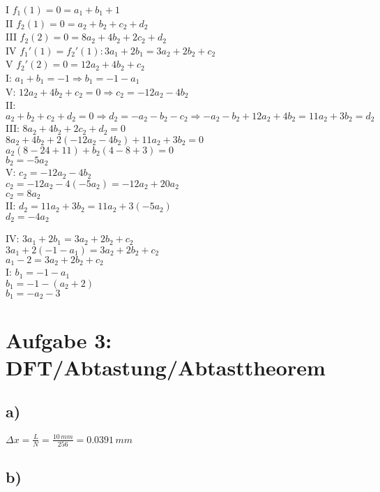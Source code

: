 \documentclass[a4paper,11pt,oneside]{scrartcl}
\begin{document}
I $f_1(1) = 0 = a_1 + b_1 + 1$\\
II $f_2(1) = 0 = a_2 + b_2 + c_2 + d_2$\\
III $f_2(2) = 0 = 8a_2 + 4b_2 + 2c_2 + d_2$\\
IV $f_1'(1) = f_2'(1): 3a_1 + 2b_1 = 3a_2 + 2b_2 + c_2$\\
V $f_2'(2) = 0 = 12a_2 + 4b_2 + c_2$\\

I: $a_1 + b_1 = -1 \Rightarrow b_1 = -1 -a_1$\\
V: $12a_2 + 4b_2 + c_2 = 0 \Rightarrow c_2 = -12a_2 - 4b_2$\\
II: $a_2 + b_2 + c_2 + d_2 = 0 \Rightarrow d_2 = -a_2 - b_2 - c_2 \Rightarrow -a_2 - b_2 + 12a_2 +4b_2 = 11a_2 + 3b_2 = d_2$\\
III: $8a_2 + 4b_2 + 2c_2 + d_2 = 0$\\
$8a_2 + 4b_2 + 2(-12a_2 - 4b_2) + 11a_2 + 3b_2 = 0$\\
$a_2(8-24+11) + b_2(4-8+3) = 0$\\
$b_2 = -5a_2$\\
V: $c_2 = -12a_2 - 4b_2$\\
$c_2 = -12a_2 -4(-5a_2) = -12a_2 + 20a_2$\\
$c_2 = 8a_2$\\

II: $d_2 = 11a_2 + 3b_2 = 11a_2 + 3(-5a_2)$\\
$d_2 = -4a_2$


IV: $3a_1 + 2b_1 = 3a_2 + 2b_2 + c_2$\\
$3a_1 + 2(-1 -a_1) = 3a_2 + 2b_2 +c_2$\\
$a_1 -2 = 3a_2 + 2b_2 +c_2$\\

I: $b_1 = -1 - a_1$\\
$b_1 = -1 - (a_2 + 2)$\\
$b_1 = -a_2 - 3$\\
\newpage

\section*{Aufgabe 3: DFT/Abtastung/Abtasttheorem}
\subsection*{a)}

$\Delta x=\frac{L}{N}=\frac{10\,mm}{256}=0.0391\,mm$

\subsection*{b)}
\end{document}
